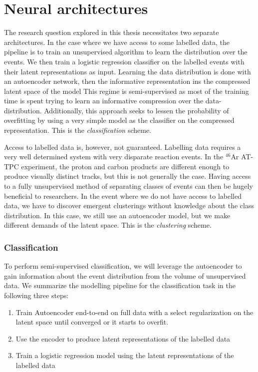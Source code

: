 
\chapter{Neural architectures}\label{ch:architectures}

The research question explored in this thesis necessitates two separate architectures. In the case where we have access to some labelled data, the pipeline is to train an unsupervised algorithm to learn the distribution over the events. We then train a logistic regression classifier on the labelled events with their latent representations as input. Learning the data distribution is done with an autoencoder network, then the informative representation ins the compressed latent space of the model This regime is semi-supervised as most of the training time is spent trying to learn an informative compression over the data-distribution. Additionally, this approach seeks to lessen the probability of overfitting by using a very simple model as the classifier on the compressed representation. This is the \textit{classification} scheme.

 Access to labelled data is, however, not guaranteed. Labelling data requires a very well determined system with very disparate reaction events. In the ${}^{46}$Ar AT-TPC experiment, the proton and carbon products are different enough to produce visually distinct tracks, but this is not generally the case. Having access to a fully unsupervised method of separating classes of events can then be hugely beneficial to researchers. In the event where we do not have access to labelled data, we have to discover emergent clusterings without knowledge about the class distribution. In this case, we still use an autoencoder model, but we make different demands of the latent space. This is the \textit{clustering} scheme. 

\subsection{Classification}
To perform semi-supervised classification, we will leverage the autoencoder to gain information about the event distribution from the volume of unsupervised data. We summarize the modelling pipeline for the classification task in the following three steps: 

\begin{enumerate}
\item Train Autoencoder end-to-end on full data with a select regularization on the latent space until converged or it starts to overfit. 
\item Use the encoder to produce latent representations of the labelled data 
\item Train a logistic regression model using the latent representations of the labelled data 
\end{enumerate}

